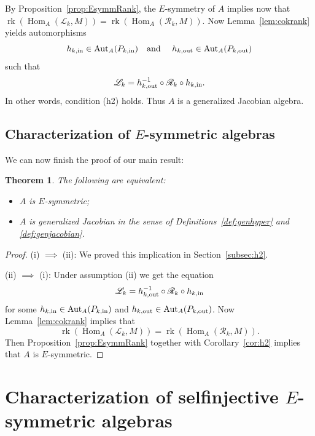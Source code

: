 \documentclass[12pt,reqno]{amsart}
\newtheorem{Thm}{Theorem}[section]
\theoremstyle{definition}
\newcommand{\scL}{{\mathscr L}}
\newcommand{\scR}{{\mathscr R}}
\newcommand{\rk}{\operatorname{rk}}
\newcommand{\Hom}{\operatorname{Hom}}
\newcommand{\Aut}{\operatorname{Aut}}
\begin{document}
By Proposition~\ref{prop:EsymmRank}, the $E$-symmetry of $A$ implies now that
$\rk(\Hom_A(\scL_k,M)) = \rk(\Hom_A(\scR_k,M))$.
Now Lemma~\ref{lem:cokrank} yields automorphisms
\[
h_{k,{\rm in}} \in \Aut_A(P_{k,{\rm in}})
\text{\quad and \quad}
h_{k,{\rm out}} \in \Aut_A(P_{k,{\rm out}})
\]
such that
$$
\scL_k = h_{k,{\rm out}}^{-1} \circ \scR_k \circ h_{k,{\rm in}}.
$$
In other words, condition (h2) holds.
Thus $A$ is a generalized Jacobian algebra.




\subsection{Characterization of $E$-symmetric algebras}
We can now finish the proof of our main result:

\begin{Thm}\label{thm:mainpart2}
The following are equivalent:
\begin{itemize}\itemsep2mm

\item[(i)] 
$A$ is $E$-symmetric;

\item[(ii)] $A$ is generalized Jacobian in the sense of Definitions~\ref{def:genhyper} and \ref{def:genjacobian}.

\end{itemize}
\end{Thm}

\begin{proof}
(i) $\implies$ (ii):
We proved this implication in Section~\ref{subsec:h2}.

(ii) $\implies$ (i):
Under assumption (ii) we get the equation
$$
\scL_k = h_{k,{\rm out}}^{-1} \circ \scR_k \circ h_{k,{\rm in}}
$$
for some $h_{k,{\rm in}} \in \Aut_A(P_{k,{\rm in}})$ and $h_{k,{\rm out}} \in \Aut_A(P_{k,{\rm out}})$.
Now Lemma~\ref{lem:cokrank} implies that
$$
\rk(\Hom_A(\scL_k,M)) = \rk(\Hom_A(\scR_k,M)).
$$
Then
Proposition~\ref{prop:EsymmRank} together with
Corollary~\ref{cor:h2} implies that $A$ is $E$-symmetric.
\end{proof}



\section{Characterization of selfinjective $E$-symmetric algebras}\label{sec:5}
\end{document}
